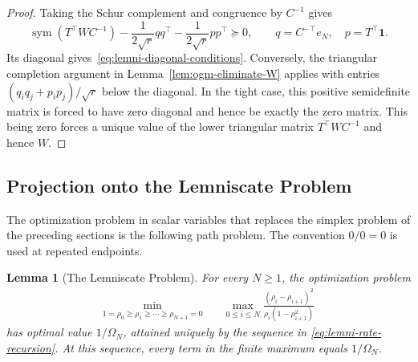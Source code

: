 \documentclass[11pt]{article}
\newtheorem{lemma}[thm]{Lemma}
\begin{document}
\begin{proof}
Taking the Schur complement and congruence by $C^{-1}$ gives
\[
 \operatorname{sym}(T^\top WC^{-1})
 -\frac1{2\sqrt r}qq^\top-\frac1{2\sqrt r}pp^\top\succeq0,
 \qquad q=C^{-\top}e_N,\quad p=T^\top\mathbf1.
\]
Its diagonal gives~\eqref{eq:lemni-diagonal-conditions}. Conversely, the
triangular completion argument in Lemma~\ref{lem:ogm-eliminate-W} applies
with entries $(q_iq_j+p_ip_j)/\sqrt r$ below the diagonal. In the tight case, this positive semidefinite matrix is forced to have zero diagonal and hence be exactly the zero matrix. This being zero forces a unique value of the lower triangular matrix $T^\top WC^{-1}$ and hence $W$.
\end{proof}

\subsection{Projection onto the Lemniscate Problem}

The optimization problem in scalar variables that replaces the simplex problem
of the preceding sections is the following path problem. The convention $0/0=0$ is used at repeated
endpoints.

\begin{lemma}[The Lemniscate Problem]\label{lem:lemni-scalar-prob}
For every $N\geq1$, the optimization problem
\begin{equation}\label{eq:lemni-scalar-prob}
\begin{aligned}
 \min_{1=\rho_0\geq\rho_1\geq\cdots\geq\rho_{N+1}=0}\quad
 &\max_{0\leq i\leq N}
 \frac{(\rho_i-\rho_{i+1})^2}
 {\rho_i(1-\rho_{i+1}^2)}
\end{aligned}
\end{equation}
has optimal value $1/\Omega_N$, attained uniquely by the sequence in
\eqref{eq:lemni-rate-recursion}. At this sequence, every term in the finite
maximum equals $1/\Omega_N$. 
\end{lemma}
\end{document}
